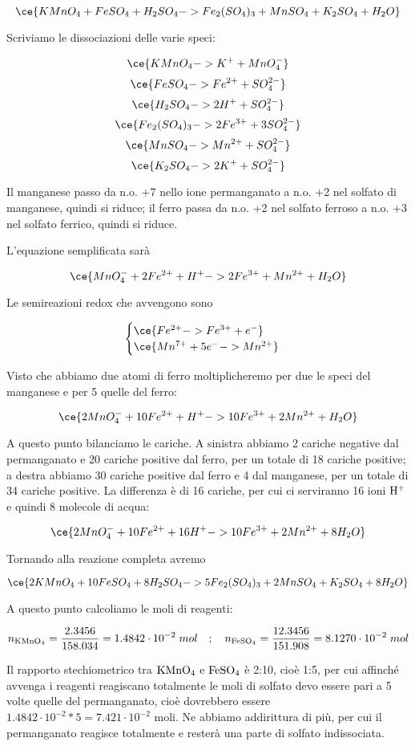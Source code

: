 $$\ce{KMnO_4 + FeSO_4 + H_2SO_4 -> Fe_2(SO_4)_3 + MnSO_4 + K_2SO_4 + H_2O}$$

Scriviamo le dissociazioni delle varie speci:

$$\ce{KMnO_4 -> K^+ + MnO_4^-}$$
$$\ce{FeSO_4 -> Fe^{2+} + SO_4^{2-}}$$
$$\ce{H_2SO_4 -> 2H^+ + SO_4^{2-}}$$
$$\ce{Fe_2(SO_4)_3 -> 2Fe^{3+} + 3SO_4^{2-}}$$
$$\ce{MnSO_4 -> Mn^{2+} + SO_4^{2-}}$$
$$\ce{K_2SO_4 -> 2K^+ + SO_4^{2-}}$$

Il manganese passo da n.o. +7 nello ione permanganato a n.o. +2 nel solfato di manganese, quindi si riduce; il ferro passa da n.o. +2 nel solfato ferroso a n.o. +3 nel solfato ferrico, quindi si riduce.

L'equazione semplificata sarà

$$\ce{MnO_4^- + 2Fe^{2+} + H^+ -> 2Fe^{3+} + Mn^{2+} + H_2O}$$

Le semireazioni redox che avvengono sono

$$\begin{cases}
    \ce{Fe^{2+} -> Fe^{3+} + e^-}\\
    \ce{Mn^{7+} + 5e^- -> Mn^{2+}}
\end{cases}$$

Visto che abbiamo due atomi di ferro moltiplicheremo per due le speci del manganese e per 5 quelle del ferro:

$$\ce{2MnO_4^- + 10Fe^{2+} + H^+ -> 10Fe^{3+} + 2Mn^{2+} + H_2O}$$

A questo punto bilanciamo le cariche. A sinistra abbiamo 2 cariche negative dal permanganato e 20 cariche positive dal ferro, per un totale di 18 cariche positive; a destra abbiamo 30 cariche positive dal ferro e 4 dal manganese, per un totale di 34 cariche positive. La differenza è di 16 cariche, per cui ci serviranno 16 ioni $\rm H^+$ e quindi 8 molecole di acqua:

$$\ce{2MnO_4^- + 10Fe^{2+} + 16H^+ -> 10Fe^{3+} + 2Mn^{2+} + 8H_2O}$$

Tornando alla reazione completa avremo

$$\ce{2KMnO_4 + 10FeSO_4 + 8H_2SO_4 -> 5Fe_2(SO_4)_3 + 2MnSO_4 + K_2SO_4 + 8H_2O}$$

A questo punto calcoliamo le moli di reagenti:

$$n_{\rm KMnO_4}=\frac{2.3456}{158.034}
=1.4842 \cdot 10^{-2}\;mol
\quad;\quad
n_{\rm FeSO_4}=\frac{12.3456}{151.908}
=8.1270 \cdot 10^{-2}\;mol$$

Il rapporto stechiometrico tra $\rm KMnO_4$ e $\rm FeSO_4$ è 2:10, cioè 1:5, per cui affinché avvenga i reagenti reagiscano totalmente le moli di solfato devo essere pari a 5 volte quelle del permanganato, cioè dovrebbero essere $1.4842 \cdot 10^{-2}*5=7.421 \cdot 10^{-2}$ moli. Ne abbiamo addirittura di più, per cui il permanganato reagisce totalmente e resterà una parte di solfato indissociata.


